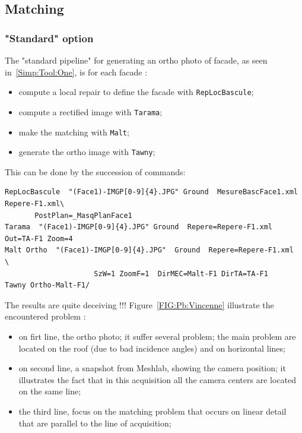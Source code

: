 \subsection{Matching}


\subsubsection{"Standard" option}

The "standard pipeline" for generating an ortho photo of facade, 
as seen in~\ref{Simp:Tool:One}, is for each facade :

\begin{itemize} 
   \item compute a local repair to define the facade with {\tt RepLocBascule};
   \item compute a rectified image with {\tt Tarama}; 
   \item make the matching with {\tt Malt};
   \item generate the ortho image with {\tt  Tawny};
\end{itemize} 

This can be done by the succession of commands:

\begin{verbatim}
RepLocBascule  "(Face1)-IMGP[0-9]{4}.JPG" Ground  MesureBascFace1.xml Repere-F1.xml\
       PostPlan=_MasqPlanFace1
Tarama  "(Face1)-IMGP[0-9]{4}.JPG" Ground  Repere=Repere-F1.xml  Out=TA-F1 Zoom=4
Malt Ortho  "(Face1)-IMGP[0-9]{4}.JPG"  Ground  Repere=Repere-F1.xml  \
                     SzW=1 ZoomF=1  DirMEC=Malt-F1 DirTA=TA-F1
Tawny Ortho-Malt-F1/
\end{verbatim}

The results are quite deceiving !!! Figure~\ref{FIG:Pb:Vincenne} illustrate the
encountered problem :

\begin{itemize}
    \item on firt line, the ortho photo; it suffer several problem; the main problem
         are located on the roof (due to bad incidence angles) and on horizontal lines;

    \item on second line, a snapshot from Meshlab, showing the camera position;
          it illustrates the fact that in this acquisition all the camera centers are 
         located on the same line;

    \item the third line, focus on the matching problem  that occurs on linear detail that
          are parallel to the line of acquisition; 
\end{itemize}


